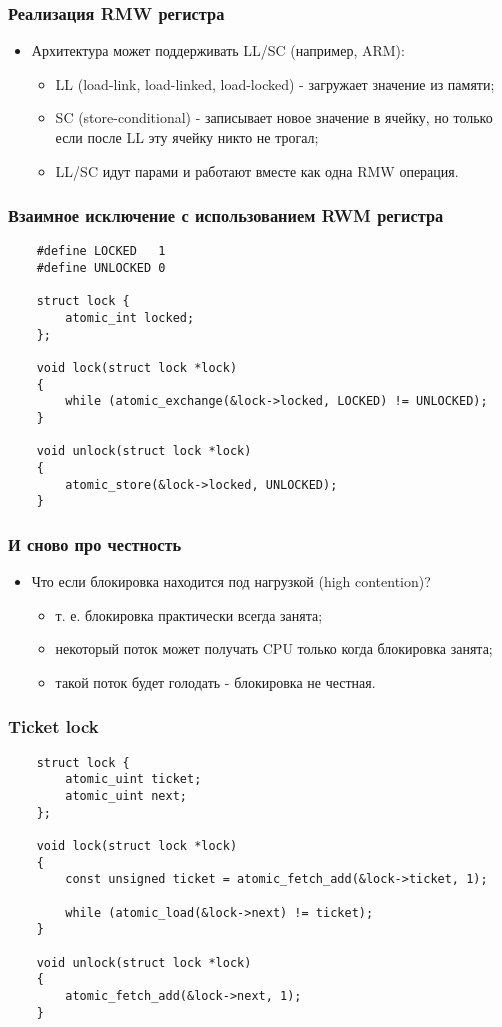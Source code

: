 \begin{frame}
\frametitle{Реализация RMW регистра}
\begin{itemize}
    \item<1->Архитектура может поддерживать LL/SC (например, ARM):
    \begin{itemize}
        \item<2->LL (load-link, load-linked, load-locked) - загружает значение
             из памяти;
        \item<3->SC (store-conditional) - записывает новое значение в ячейку,
             но только если после LL эту ячейку никто не трогал;
        \item<4->LL/SC идут парами и работают вместе как одна RMW операция.
    \end{itemize}
\end{itemize}
\end{frame}

\begin{frame}[fragile]
\frametitle{Взаимное исключение с использованием RWM регистра}
\begin{lstlisting}
    #define LOCKED   1
    #define UNLOCKED 0

    struct lock {
        atomic_int locked;
    };

    void lock(struct lock *lock)
    {
        while (atomic_exchange(&lock->locked, LOCKED) != UNLOCKED);
    }

    void unlock(struct lock *lock)
    {
        atomic_store(&lock->locked, UNLOCKED);
    }
\end{lstlisting}
\end{frame}

\begin{frame}
\frametitle{И сново про честность}
\begin{itemize}
    \item<1->Что если блокировка находится под нагрузкой (high contention)?
    \begin{itemize}
        \item<2->т. е. блокировка практически всегда занята;
        \item<3->некоторый поток может получать CPU только когда блокировка
             занята;
        \item<4->такой поток будет голодать - блокировка не честная.
    \end{itemize}
\end{itemize}
\end{frame}

\begin{frame}[fragile]
\frametitle{Ticket lock}
\begin{lstlisting}
    struct lock {
        atomic_uint ticket;
        atomic_uint next;
    };

    void lock(struct lock *lock)
    {
        const unsigned ticket = atomic_fetch_add(&lock->ticket, 1);

        while (atomic_load(&lock->next) != ticket);
    }

    void unlock(struct lock *lock)
    {
        atomic_fetch_add(&lock->next, 1);
    }
\end{lstlisting}
\end{frame}

